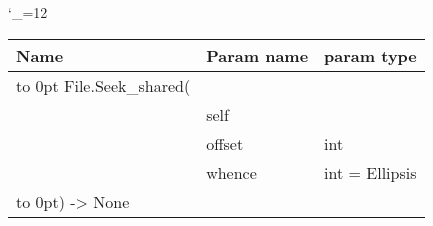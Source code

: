 \begingroup \catcode`\_=12 \tt
\begin{tabular}{lll}
\toprule
\textrm{Name}&\textrm{Param name}&\textrm{param type}\\
\midrule
\hbox to 0pt {File.Seek_shared(\hss}\\
& self\\
& offset & int\\
& whence & int = Ellipsis\\
\hbox to 0pt{) -> None\hss}\\
\bottomrule
\end{tabular}
\endgroup
